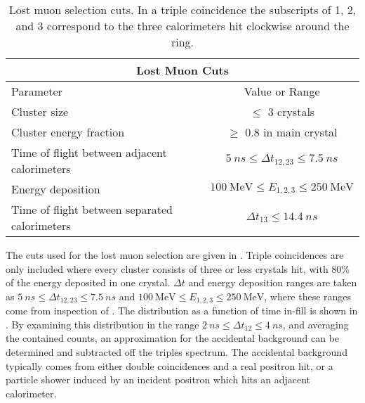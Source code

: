 \begin{table}[]
\centering
\setlength\tabcolsep{10pt}
\renewcommand{\arraystretch}{1.2}
\begin{tabular*}{1\linewidth}{@{\extracolsep{\fill}}lc}
  \hline
    \multicolumn{2}{c}{\textbf{Lost Muon Cuts}} \\
  \hline\hline
    Parameter & Value or Range \\
  \hline
    Cluster size & $\leq$ 3 crystals \\
    Cluster energy fraction & $\geq$ 0.8 in main crystal \\
    Time of flight between adjacent calorimeters & $\SI{5}{ns} \leq \Delta t_{12, 23} \leq \SI{7.5}{ns}$ \\
    Energy deposition & $\SI{100}{\MeV} \leq E_{1,2,3} \leq \SI{250}{\MeV}$ \\
    Time of flight between separated calorimeters & $\Delta t_{13} \leq \SI{14.4}{ns}$ \\
  \hline 
\end{tabular*}
\caption[Lost muon cuts]{Lost muon selection cuts. In a triple coincidence the subscripts of 1, 2, and 3 correspond to the three calorimeters hit clockwise around the ring.}
\label{tab:lostmuoncuts}
\end{table}



The cuts used for the lost muon selection are given in . Triple coincidences are only included where every cluster consists of three or less crystals hit, with 80\% of the energy deposited in one crystal. $\Delta t$ and energy deposition ranges are taken as $\SI{5}{ns} \leq \Delta t_{12, 23} \leq \SI{7.5}{ns}$ and $\SI{100}{\MeV} \leq E_{1,2,3} \leq \SI{250}{\MeV}$, where these ranges come from inspection of . The \DT distribution as a function of time in-fill is shown in . By examining this distribution in the range $\SI{2}{ns} \leq \Delta t_{12} \leq \SI{4}{ns}$, and averaging the contained counts, an approximation for the accidental background can be determined and subtracted off the triples spectrum. The accidental background typically comes from either double coincidences and a real positron hit, or a particle shower induced by an incident positron which hits an adjacent calorimeter. 


